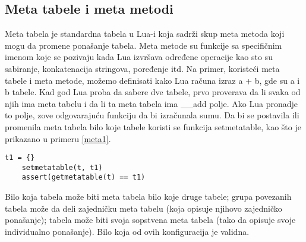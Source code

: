 \documentclass[a4paper]{article}
\begin{document}
\subsection*{Meta tabele i meta metodi}
Meta tabela je standardna tabela u Lua-i koja sadrži skup meta metoda koji mogu da promene ponašanje tabela. Meta metode su funkcije sa specifičnim imenom koje se pozivaju kada Lua izvršava određene operacije kao sto su sabiranje, konkatenacija stringova, poređenje itd. Na primer, koristeći meta tabele i meta metode, možemo definisati kako Lua računa izraz a + b, gde su a i b tabele. Kad god Lua proba da sabere dve tabele, prvo proverava da li svaka od njih ima meta tabelu i da li ta meta tabela ima \_\_add polje. Ako Lua pronadje to polje, zove odgovarajuću funkciju da bi izračunala sumu.
Da bi se postavila ili promenila meta tabela bilo koje tabele koristi se funkcija setmetatable, kao što je prikazano u primeru \ref{meta1}.
\begin{lstlisting}[caption={Postavljanje metatabele},frame=single, label=meta1]
t1 = {}
    setmetatable(t, t1)
    assert(getmetatable(t) == t1)
\end{lstlisting}
Bilo koja tabela može biti meta tabela bilo koje druge tabele; grupa povezanih tabela može da deli zajedničku meta tabelu (koja opisuje njihovo zajedničko ponašanje); tabela može biti svoja sopstvena meta tabela (tako da opisuje svoje individualno ponašanje). Bilo koja od ovih konfiguracija je validna.
\end{document}
